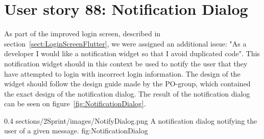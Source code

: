 \section{User story 88: Notification Dialog}
\label{sect:NotifyDialog}
As part of the improved login screen, described in section~\ref{sect:LoginScreenFlutter}, we were assigned an additional issue: "As a developer I would like a notification widget so that I avoid duplicated code". 
This notification widget should in this context be used to notify the user that they have attempted to login with incorrect login information.
The design of the widget should follow the design guide made by the PO-group, which contained the exact design of the notification dialog. 
 The result of the notification dialog can be seen on figure~\ref{fig:NotificationDialog}.

        {0.4} %
        {sections/2Sprint/images/NotifyDialog.png} %
        {A notification dialog notifying the user of a given message.} %
        {fig:NotificationDialog} %